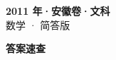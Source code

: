 \documentclass[zihao=-4, a4paper]{ctexart}
\begin{document}
\begin{center}
  {\Large\bfseries 2011 年·安徽卷·文科}\\[4pt]
  {\large 数学 · 简答版}
\end{center}
\medskip
{}

\clearpage
{}
\begin{center}{\Large\bfseries 答案速查}\end{center}
\medskip

\end{document}

